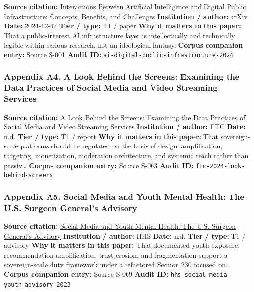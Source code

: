 \documentclass[
  american,
  11pt,
  letterpaper,
]{article}
\begin{document}
\textbf{Source citation:}
\href{https://arxiv.org/abs/2412.05761}{Interactions Between Artificial
Intelligence and Digital Public Infrastructure: Concepts, Benefits, and
Challenges} \textbf{Institution / author:} arXiv \textbf{Date:}
2024-12-07 \textbf{Tier / type:} T1 / paper \textbf{Why it matters in
this paper:} That a public-interest AI infrastructure layer is
intellectually and technically legible within serious research, not an
ideological fantasy. \textbf{Corpus companion entry:} Source S-001
\textbf{Audit ID:} \texttt{ai-digital-public-infrastructure-2024}

\subsubsection{Appendix A4. A Look Behind the Screens: Examining the
Data Practices of Social Media and Video Streaming
Services}\label{appendix-a4-a-look-behind-the-screens-examining-the-data-practices-of-social-media-and-video-streaming-services}

\textbf{Source citation:}
\href{https://www.ftc.gov/reports/look-behind-screens-examining-data-practices-social-media-video-streaming-services}{A
Look Behind the Screens: Examining the Data Practices of Social Media
and Video Streaming Services} \textbf{Institution / author:} FTC
\textbf{Date:} n.d. \textbf{Tier / type:} T1 / report \textbf{Why it
matters in this paper:} That sovereign-scale platforms should be
regulated on the basis of design, amplification, targeting,
monetization, moderation architecture, and systemic reach rather than
passiv\ldots{} \textbf{Corpus companion entry:} Source S-063
\textbf{Audit ID:} \texttt{ftc-2024-look-behind-screens}

\subsubsection{Appendix A5. Social Media and Youth Mental Health: The
U.S. Surgeon General's
Advisory}\label{appendix-a5-social-media-and-youth-mental-health-the-u-s-surgeon-general-s-advisory}

\textbf{Source citation:}
\href{https://www.hhs.gov/surgeongeneral/priorities/youth-mental-health/social-media/index.html}{Social
Media and Youth Mental Health: The U.S. Surgeon General's Advisory}
\textbf{Institution / author:} HHS \textbf{Date:} n.d. \textbf{Tier /
type:} T1 / advisory \textbf{Why it matters in this paper:} That
documented youth exposure, recommendation amplification, trust erosion,
and fragmentation support a sovereign-scale duty framework under a
refactored Section 230 focused on\ldots{} \textbf{Corpus companion
entry:} Source S-069 \textbf{Audit ID:}
\texttt{hhs-social-media-youth-advisory-2023}
\end{document}
